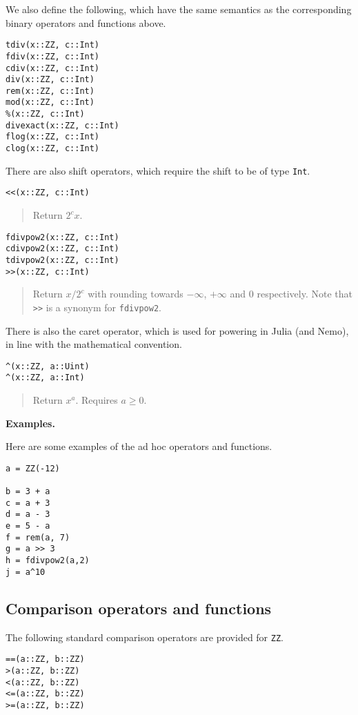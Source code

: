 \documentclass[a4paper,10pt]{article}
\newcommand{\code}{\lstinline}
\newcommand{\desc}[1]{\vspace{-3mm}\begin{quote}#1\end{quote}}
\begin{document}
{{{We also define the following, which have the same semantics as the corresponding
binary operators and functions above.

\begin{lstlisting}
tdiv(x::ZZ, c::Int)
fdiv(x::ZZ, c::Int)
cdiv(x::ZZ, c::Int)
div(x::ZZ, c::Int)
rem(x::ZZ, c::Int)
mod(x::ZZ, c::Int)
%(x::ZZ, c::Int)
divexact(x::ZZ, c::Int)
flog(x::ZZ, c::Int)
clog(x::ZZ, c::Int)
\end{lstlisting}

There are also shift operators, which require the shift to be of type \code{Int}.

\begin{lstlisting}
<<(x::ZZ, c::Int)
\end{lstlisting}

\desc{Return $2^c x$.}

\begin{lstlisting}
fdivpow2(x::ZZ, c::Int)
cdivpow2(x::ZZ, c::Int)
tdivpow2(x::ZZ, c::Int)
>>(x::ZZ, c::Int)
\end{lstlisting}

\desc{Return $x/2^c$ with rounding towards $-\infty$, $+\infty$ and $0$ respectively. 
Note that \code{>>} is a synonym for \code{fdivpow2}.}

There is also the caret operator, which is used for powering in Julia (and Nemo), in
line with the mathematical convention.

\begin{lstlisting}
^(x::ZZ, a::Uint)
^(x::ZZ, a::Int)
\end{lstlisting}

\desc{Return $x^a$. Requires $a \geq 0$.}

\textbf{Examples.}

Here are some examples of the ad hoc operators and functions.

\begin{lstlisting}
a = ZZ(-12)

b = 3 + a
c = a + 3
d = a - 3
e = 5 - a
f = rem(a, 7)
g = a >> 3
h = fdivpow2(a,2)
j = a^10
\end{lstlisting}

\subsection{Comparison operators and functions}

The following standard comparison operators are provided for \code{ZZ}.

\begin{lstlisting}
==(a::ZZ, b::ZZ)
>(a::ZZ, b::ZZ)
<(a::ZZ, b::ZZ)
<=(a::ZZ, b::ZZ)
>=(a::ZZ, b::ZZ)
\end{lstlisting}

}}}
\end{document}
